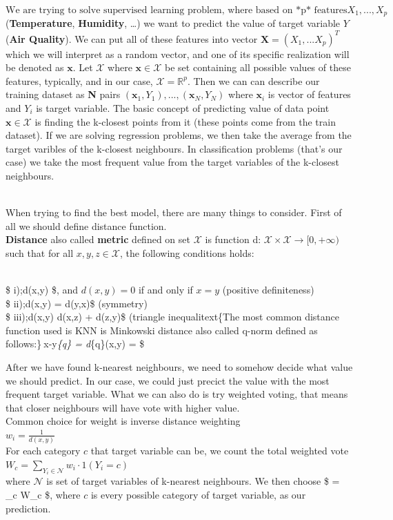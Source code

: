 \documentclass[
  letterpaper,
  DIV=11,
  numbers=noendperiod]{scrartcl}
\begin{document}
\[ \text{We are trying to solve supervised learning problem, where based on *p* features} X_{1}, ..., X_{p}\]
(\textbf{Temperature}, \textbf{Humidity}, \ldots) we want to predict the
value of target variable \(Y\) (\textbf{Air Quality}). We can put all of
these features into vector \(\textbf{X} = (X_{1}, ... X{_p})^T\) which
we will interpret as a random vector, and one of its specific
realization will be denoted as \(\mathbf{x}\). Let \(\mathcal{X}\) where
\(\textbf{x} \in \mathcal{X}\) be set containing all possible values of
these features, typically, and in our case,
\(\mathcal{X} = \mathbb{R}^p\). Then we can can describe our training
dataset as \textbf{N} pairs
\((\textbf{x}_{1}, Y_{1}), ..., (\textbf{x}_{N}, Y_{N})\) where
\(\textbf{x}_{i}\) is vector of features and \(Y_{i}\) is target
variable. The basic concept of predicting value of data point
\(\mathbf{x} \in \mathcal{X}\) is finding the k-closest points from it
(these points come from the train dataset). If we are solving regression
problems, we then take the average from the target varibles of the
k-closest neighbours. In classification problems (that's our case) we
take the most frequent value from the target variables of the k-closest
neighbours.\\
\strut \\
When trying to find the best model, there are many things to consider.
First of all we should define distance function.\\
\textbf{Distance} also called \textbf{metric} defined on set
\(\mathcal{X}\) is function d:
\(\mathcal{X} \times \mathcal{X} \rightarrow [0, +\infty)\) such that
for all \(x, y, z \in \mathcal{X}\), the following conditions holds:\\
\strut \\
\$ i);d(x,y) \$, and \(d(x,y) = 0\) if and only if \(x = y\)
(positive definiteness)\\
\$ ii);d(x,y) = d(y,x)\$ (symmetry)\\
\$ iii);d(x,y) \geq d(x,z) + d(z,y)\$ (triangle inequalitext\{The most
common distance function used is KNN is Minkowski distance also called
q-norm defined as follows:\}\(\
\)\textbar\textbar x-y\textbar\textbar{}\emph{\{q\} = d}\{q\}(x,y) =
\sqrt[q]{\sum_{i=1}^{p} (x_i - y_i)^q}\$

After we have found k-nearest neighbours, we need to somehow decide what
value we should predict. In our case, we could just precict the value
with the most frequent target variable. What we can also do is try
weighted voting, that means that closer neighbours will have vote with
higher value.\\
Common choice for weight is inverse distance weighting\\
\(w_{i} = \frac{1}{d(x,y)}\)\\
For each category \(c\) that target variable can be, we count the total
weighted vote
\(W_{c} = \sum_{Y_i \in \mathcal{N}} w_i \cdot 1(Y_i = c)\)\\
where \(\mathcal{N}\) is set of target variables of k-nearest
neighbours. We then choose \$ = \arg\max\_c W\_c \$, where \(c\)
is every possible category of target variable, as our prediction.
\end{document}
